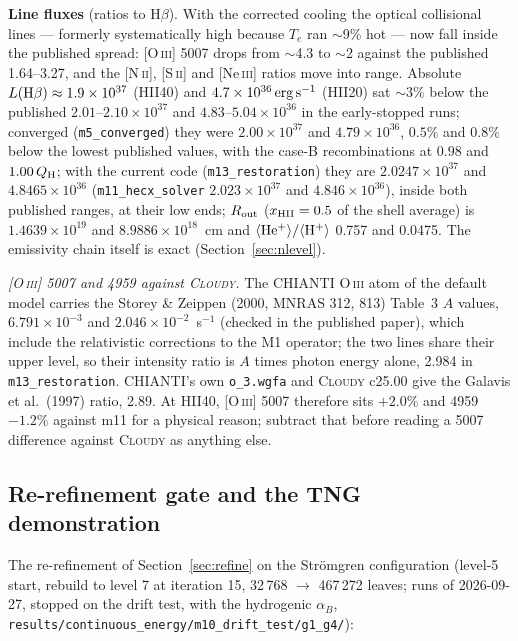 \documentclass[english,a4paper]{my_memo}
\newcommand{\code}[1]{\texttt{#1}}
\begin{document}
\textbf{Line fluxes} (ratios to H$\beta$).  With the corrected cooling
the optical collisional lines --- formerly systematically high because
$T_e$ ran $\sim$9\% hot --- now fall inside the published spread:
[O\,\textsc{iii}] 5007 drops from $\sim$4.3 to $\sim$2 against the
published 1.64--3.27, and the [N\,\textsc{ii}], [S\,\textsc{ii}] and
[Ne\,\textsc{iii}] ratios move into range.  Absolute
$L({\rm H}\beta) \approx 1.9 \times 10^{37}$ (HII40) and
$4.7 \times 10^{36}\,{\rm erg\,s^{-1}}$ (HII20) sat $\sim$3\% below the
published $2.01$--$2.10 \times 10^{37}$ and $4.83$--$5.04 \times 10^{36}$
in the early-stopped runs; converged (\code{m5\_converged}) they were
$2.00 \times 10^{37}$ and $4.79 \times 10^{36}$, $0.5\%$ and $0.8\%$ below
the lowest published values, with the case-B recombinations at $0.98$ and
$1.00\,Q_{\rm H}$; with the current code (\code{m13\_restoration}) they are
$2.0247 \times 10^{37}$ and $4.8465 \times 10^{36}$ (\code{m11\_hecx\_solver}
$2.023 \times 10^{37}$ and $4.846 \times 10^{36}$), inside both published
ranges, at their low ends; $R_{\rm out}$ ($x_{\rm HII} = 0.5$ of the shell
average) is $1.4639 \times 10^{19}$ and $8.9886 \times 10^{18}$~cm and
$\langle{\rm He^+}\rangle/\langle{\rm H^+}\rangle$ 0.757 and 0.0475.  The
emissivity chain itself is exact (Section~\ref{sec:nlevel}).

\emph{[O\,\textsc{iii}] 5007 and 4959 against \textsc{Cloudy}.}  The
CHIANTI O\,\textsc{iii} atom of the default model carries the
Storey \& Zeippen (2000, MNRAS 312, 813) Table~3 $A$ values,
$6.791{\times}10^{-3}$ and $2.046{\times}10^{-2}$~s$^{-1}$ (checked in the
published paper), which include the relativistic corrections to the M1
operator; the two lines share their upper level, so their intensity ratio
is $A$ times photon energy alone, 2.984 in \code{m13\_restoration}.
CHIANTI's own \code{o\_3.wgfa} and \textsc{Cloudy} c25.00 give the
Galavis et al.\ (1997) ratio, 2.89.  At HII40, [O\,\textsc{iii}] 5007
therefore sits $+2.0\%$ and 4959 $-1.2\%$ against m11 for a physical
reason; subtract that before reading a 5007 difference against
\textsc{Cloudy} as anything else.

\subsection{Re-refinement gate and the TNG demonstration}
The re-refinement of Section~\ref{sec:refine} on the Str\"omgren
configuration (level-5 start, rebuild to level 7 at iteration 15,
32\,768 $\rightarrow$ 467\,272 leaves; runs of 2026-09-27, stopped on the drift test, with the
hydrogenic $\alpha_B$, \code{results/continuous\_energy/m10\_drift\_test/g1\_g4/}):
\end{document}
